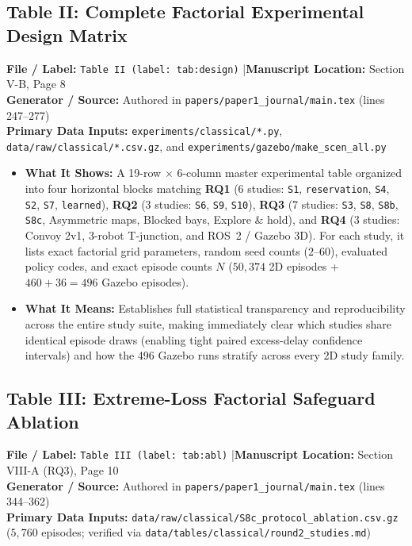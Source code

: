 \documentclass[10pt,a4paper]{article}
\newcommand{\meta}[4]{%
  \vspace{2pt}%
  \noindent\colorbox{BoxBg}{%
    \parbox{\dimexpr\textwidth-2\fboxsep\relax}{%
      \footnotesize\raggedright
      \textbf{File / Label:} \texttt{#1} \quad|\quad \textbf{Manuscript Location:} #2\\[1pt]
      \textbf{Generator / Source:} #3\\[1pt]
      \textbf{Primary Data Inputs:} #4%
    }%
  }\par\vspace{4pt}%
}
\begin{document}
\subsection{Table II: Complete Factorial Experimental Design Matrix}

\meta{Table II (label: tab:design)}{Section V-B, Page 8}{Authored in \texttt{papers/paper1\_journal/main.tex} (lines 247--277)}{\texttt{experiments/classical/*.py}, \texttt{data/raw/classical/*.csv.gz}, and \texttt{experiments/gazebo/make\_scen\_all.py}}

\begin{itemize}
  \item \textbf{What It Shows:} A 19-row $\times$ 6-column master experimental table organized into four horizontal blocks matching \textbf{RQ1} (6 studies: \texttt{S1}, \texttt{reservation}, \texttt{S4}, \texttt{S2}, \texttt{S7}, \texttt{learned}), \textbf{RQ2} (3 studies: \texttt{S6}, \texttt{S9}, \texttt{S10}), \textbf{RQ3} (7 studies: \texttt{S3}, \texttt{S8}, \texttt{S8b}, \texttt{S8c}, Asymmetric maps, Blocked bays, Explore \& hold), and \textbf{RQ4} (3 studies: Convoy 2v1, 3-robot T-junction, and ROS~2 / Gazebo 3D). For each study, it lists exact factorial grid parameters, random seed counts ($2$--$60$), evaluated policy codes, and exact episode counts $N$ ($50{,}374$ 2D episodes + $460+36=496$ Gazebo episodes).
  \item \textbf{What It Means:} Establishes full statistical transparency and reproducibility across the entire study suite, making immediately clear which studies share identical episode draws (enabling tight paired excess-delay confidence intervals) and how the 496 Gazebo runs stratify across every 2D study family.
\end{itemize}

\subsection{Table III: Extreme-Loss Factorial Safeguard Ablation}

\meta{Table III (label: tab:abl)}{Section VIII-A (RQ3), Page 10}{Authored in \texttt{papers/paper1\_journal/main.tex} (lines 344--362)}{\texttt{data/raw/classical/S8c\_protocol\_ablation.csv.gz} ($5{,}760$ episodes; verified via \texttt{data/tables/classical/round2\_studies.md})}
\end{document}
